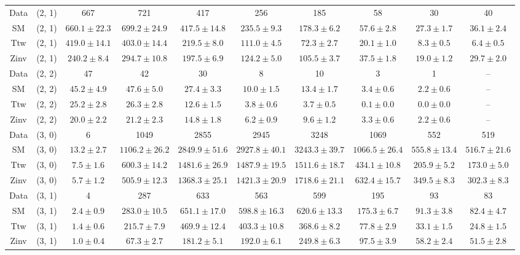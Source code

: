 \begin{table}[h!]
{\begin{tabular}{cccccccccc}
	Data & (2, 1) & 667 & 721 & 417 & 256 & 185 & 58 & 30 & 40 \\[0.5ex] 
	SM & (2, 1) & $660.1\pm 22.3$ & $699.2\pm 24.9$ & $417.5\pm 14.8$ & $235.5\pm 9.3$ & $178.3\pm 6.2$ & $57.6\pm 2.8$ & $27.3\pm 1.7$ & $36.1\pm 2.4$ \\[0.5ex] 
	Ttw & (2, 1) & $419.0\pm 14.1$ & $403.0\pm 14.4$ & $219.5\pm 8.0$ & $111.0\pm 4.5$ & $72.3\pm 2.7$ & $20.1\pm 1.0$ & $8.3\pm 0.5$ & $6.4\pm 0.5$ \\[0.5ex] 
	Zinv & (2, 1) & $240.2\pm 8.4$ & $294.7\pm 10.8$ & $197.5\pm 6.9$ & $124.2\pm 5.0$ & $105.5\pm 3.7$ & $37.5\pm 1.8$ & $19.0\pm 1.2$ & $29.7\pm 2.0$ \\[0.5ex] 
	Data & (2, 2) & 47 & 42 & 30 & 8 & 10 & 3 & 1 & -- \\[0.5ex] 
	SM & (2, 2) & $45.2\pm 4.9$ & $47.6\pm 5.0$ & $27.4\pm 3.3$ & $10.0\pm 1.5$ & $13.4\pm 1.7$ & $3.4\pm 0.6$ & $2.2\pm 0.6$ & -- \\[0.5ex] 
	Ttw & (2, 2) & $25.2\pm 2.8$ & $26.3\pm 2.8$ & $12.6\pm 1.5$ & $3.8\pm 0.6$ & $3.7\pm 0.5$ & $0.1\pm 0.0$ & $0.0\pm 0.0$ & -- \\[0.5ex] 
	Zinv & (2, 2) & $20.0\pm 2.2$ & $21.2\pm 2.3$ & $14.8\pm 1.8$ & $6.2\pm 0.9$ & $9.6\pm 1.2$ & $3.3\pm 0.6$ & $2.2\pm 0.6$ & -- \\[0.5ex] 
	Data & (3, 0) & 6 & 1049 & 2855 & 2945 & 3248 & 1069 & 552 & 519 \\[0.5ex] 
	SM & (3, 0) & $13.2\pm 2.7$ & $1106.2\pm 26.2$ & $2849.9\pm 51.6$ & $2927.8\pm 40.1$ & $3243.3\pm 39.7$ & $1066.5\pm 26.4$ & $555.8\pm 13.4$ & $516.7\pm 21.6$ \\[0.5ex] 
	Ttw & (3, 0) & $7.5\pm 1.6$ & $600.3\pm 14.2$ & $1481.6\pm 26.9$ & $1487.9\pm 19.5$ & $1511.6\pm 18.7$ & $434.1\pm 10.8$ & $205.9\pm 5.2$ & $173.0\pm 5.0$ \\[0.5ex] 
	Zinv & (3, 0) & $5.7\pm 1.2$ & $505.9\pm 12.3$ & $1368.3\pm 25.1$ & $1421.3\pm 20.9$ & $1718.6\pm 21.1$ & $632.4\pm 15.7$ & $349.5\pm 8.3$ & $302.3\pm 8.3$ \\[0.5ex] 
	Data & (3, 1) & 4 & 287 & 633 & 563 & 599 & 195 & 93 & 83 \\[0.5ex] 
	SM & (3, 1) & $2.4\pm 0.9$ & $283.0\pm 10.5$ & $651.1\pm 17.0$ & $598.8\pm 16.3$ & $620.6\pm 13.3$ & $175.3\pm 6.7$ & $91.3\pm 3.8$ & $82.4\pm 4.7$ \\[0.5ex] 
	Ttw & (3, 1) & $1.4\pm 0.6$ & $215.7\pm 7.9$ & $469.9\pm 12.4$ & $403.3\pm 10.8$ & $368.6\pm 8.2$ & $77.8\pm 2.9$ & $33.1\pm 1.5$ & $24.8\pm 1.5$ \\[0.5ex] 
	Zinv & (3, 1) & $1.0\pm 0.4$ & $67.3\pm 2.7$ & $181.2\pm 5.1$ & $192.0\pm 6.1$ & $249.8\pm 6.3$ & $97.5\pm 3.9$ & $58.2\pm 2.4$ & $51.5\pm 2.8$ \\[0.5ex] 

\end{tabular}}
\end{table}

